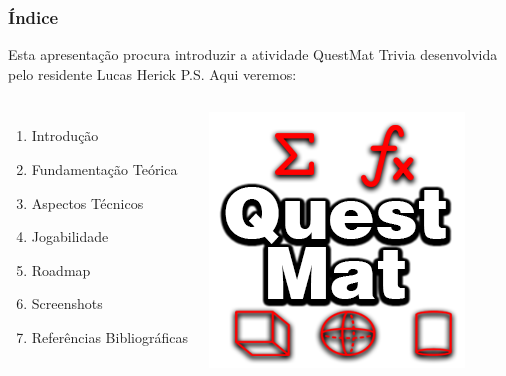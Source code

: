 \documentclass[10pt]{beamer}
\begin{document}

\begin{frame}
\frametitle{Índice}

Esta apresentação procura introduzir a atividade QuestMat Trivia desenvolvida pelo residente Lucas Herick P.S. Aqui veremos:  \vspace{3mm} \pause

\begin{columns}

\begin{enumerate}
	
		
		
	
	\color{white}
	
	\item Introdução
	\item Fundamentação Teórica
	\item Aspectos Técnicos
	\item Jogabilidade
	\item Roadmap
	\item Screenshots
	\item Referências Bibliográficas
\end{enumerate}


\includegraphics[width = 0.5\linewidth]{APP_ICON_noBG.png}

\end{columns}

\end{frame}

\end{document}
